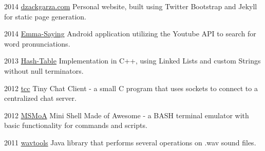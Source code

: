 \documentclass{tccv}
\begin{document}
\begin{yearlist}


\item{2014}
     {\href{http://dzackgarza.com/}{dzackgarza.com}}
     {Personal website, built using Twitter Bootstrap and Jekyll for static page generation.}

\item{2014}
     {\href{https://github.com/dzackgarza/Emma-Saying-2.0}{Emma-Saying}}
     {Android application utilizing the Youtube API to search for word pronunciations.}

\item{2013}
     {\href{https://github.com/dzackgarza/Hash_Table}{Hash-Table}}
     {Implementation in C++, using Linked Lists and custom Strings without null terminators.}

\item{2012}
     {\href{https://github.com/dzackgarza/tcc/blob/master/main.c}{tcc}}
     {Tiny Chat Client - a small C program that uses sockets to connect to a centralized chat server.}

\item{2012}
     {\href{https://github.com/dzackgarza/MsMOA}{MSMoA}}
     {Mini Shell Made of Awesome - a BASH terminal emulator with basic functionality for commands and scripts.}

\item{2011}
     {\href{https://github.com/dzackgarza/wavtools}{wavtools}}
     {Java library that performs several operations on .wav sound files.}

\end{yearlist}

\newpage



\end{document}
